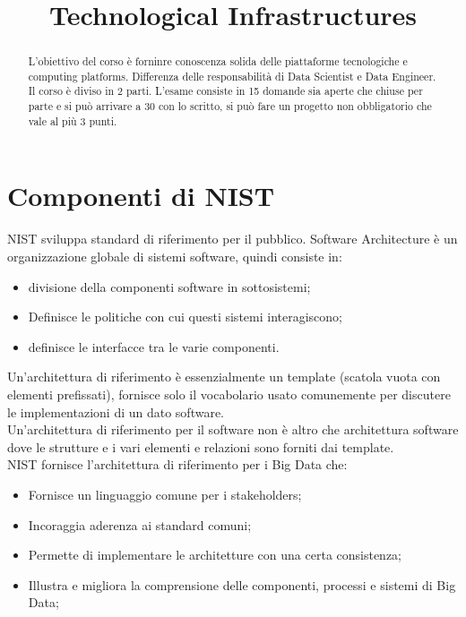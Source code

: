 \documentclass[11pt, twocolumn]{article}
\title{Technological Infrastructures}
\author{}
\date{}
\newenvironment{myitemize}
{ \begin{itemize}[topsep=0ex]
		\setlength{\itemsep}{0pt}
		\setlength{\parskip}{0pt}
		\setlength{\parsep}{0pt}     }
	{ \end{itemize}                  }
\begin{document}
\maketitle

\begin{abstract}
L'obiettivo del corso è forninre conoscenza solida delle piattaforme tecnologiche e computing platforms.
Differenza delle responsabilità di Data Scientist e Data Engineer.
Il corso è diviso in 2 parti.
L'esame consiste in 15 domande sia aperte che chiuse per parte e si può arrivare a 30 con lo scritto, si può fare un progetto non obbligatorio che vale al più 3 punti.
\end{abstract}



\section{Componenti di NIST}
NIST sviluppa standard di riferimento per il pubblico. Software Architecture è un organizzazione globale di sistemi software, quindi consiste in:
\begin{myitemize}
	\item divisione della componenti software in sottosistemi; 
	\item Definisce le politiche con cui questi sistemi interagiscono;
	\item definisce le interfacce tra le varie componenti.
\end{myitemize}
Un'architettura di riferimento è essenzialmente un template (scatola vuota con elementi prefissati), fornisce solo il vocabolario usato comunemente per discutere le implementazioni di un dato software.\\
Un'architettura di riferimento per il software non è altro che architettura software dove le strutture e i vari elementi e relazioni sono forniti dai template.
\\
NIST fornisce l'architettura di riferimento per i Big Data che:
\begin{myitemize}
	\item Fornisce un linguaggio comune per i stakeholders;
	\item Incoraggia aderenza ai standard comuni;
	\item Permette di implementare le architetture con una certa consistenza;
	\item Illustra e migliora la comprensione delle componenti, processi e  sistemi di Big Data;
\end{myitemize}
\end{document}
